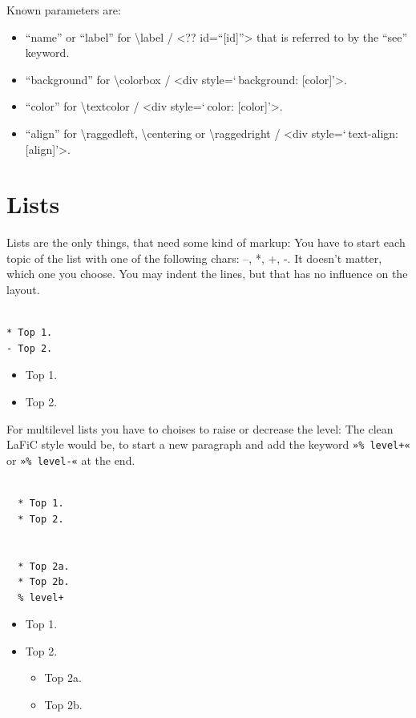 \documentclass{article}
\begin{document}
{Known parameters are:\\}

\begin{itemize}
\item “name” or “label” for \textbackslash label / <?? id=“{[id]}”> that is
  referred to by the “see” keyword.
\item “background” for \textbackslash colorbox / <div style=‘ background: {[color]}’>.
\item “color” for \textbackslash textcolor / <div style=‘ color: {[color]}’>.
\item “align” for \textbackslash raggedleft, \textbackslash centering or \textbackslash raggedright / <div
  style=‘ text-align: {[align]}’>.
\end{itemize}


\section{Lists}

{Lists are the only things, that need some kind of
markup: You have to start each topic of the list with one of
the following chars: –, *, +, -. It doesn't matter, which one you
choose. You may indent the lines, but that has no influence
on the layout.\\}

\begin{verbatim}

* Top 1.
- Top 2.
\end{verbatim}


\begin{itemize}
\item Top 1.
\item Top 2.
\end{itemize}


{For multilevel lists you have to choises to raise or
decrease the level: The clean LaFiC style would be,
to start a new paragraph and add the keyword \texttt{»\% level+«}
or \texttt{»\% level-«} at the end.\\}

\begin{verbatim}

  * Top 1.
  * Top 2.


  * Top 2a.
  * Top 2b.
  % level+
\end{verbatim}


\begin{itemize}
\item Top 1.
\item Top 2.

\begin{itemize}
\item Top 2a.
\item Top 2b.
\end{itemize}

\end{itemize}
\end{document}
